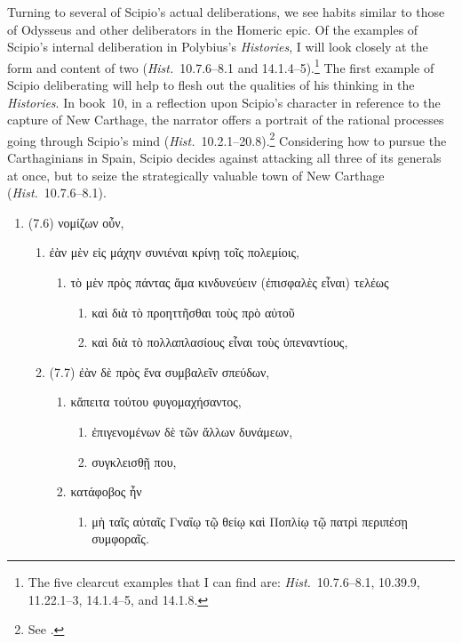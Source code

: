 \documentclass[12pt,letterpaper,oneside,final]{memoir}
\begin{document}
Turning to several of Scipio's actual deliberations, we see habits similar to those of Odysseus and other deliberators in the Homeric epic. Of the examples of Scipio's internal deliberation in Polybius's \emph{Histories}, I will look closely at the form and content of two (\emph{Hist.}~10.7.6--8.1 and 14.1.4--5).\footnote{The five clearcut examples that I can find are: \emph{Hist.}~10.7.6--8.1, 10.39.9, 11.22.1--3, 14.1.4--5, and 14.1.8.} The first example of Scipio deliberating will help to flesh out the qualities of his thinking in the \emph{Histories}. In book~10, in a reflection upon Scipio's character in reference to the capture of New Carthage, the narrator offers a portrait of the rational processes going through Scipio's mind (\emph{Hist.}~10.2.1--20.8).\footnote{See \textcite[192--196]{walbank1967}.} Considering how to pursue the Carthaginians in Spain, Scipio decides against attacking all three of its generals at once, but to seize the strategically valuable town of New Carthage (\emph{Hist.}~10.7.6--8.1). \begin{greek} \begin{enumerate} \SingleSpacing 
\item (7.6) νομίζων οὖν, 
  \begin{enumerate} 
  \item ἐὰν μὲν εἰς μάχην συνιέναι κρίνῃ τοῖς πολεμίοις, 
    \begin{enumerate} 
    \item τὸ μὲν πρὸς πάντας ἅμα κινδυνεύειν (ἐπισφαλὲς εἶναι) τελέως 
      \begin{enumerate}
      \item καὶ διὰ τὸ προηττῆσθαι τοὺς πρὸ αὐτοῦ 
      \item καὶ διὰ τὸ πολλαπλασίους εἶναι τοὺς ὑπεναντίους,
      \end{enumerate}
    \end{enumerate}
  \item (7.7) ἐὰν δὲ πρὸς ἕνα συμβαλεῖν σπεύδων, 
    \begin{enumerate}
    \item κἄπειτα τούτου φυγομαχήσαντος, 
      \begin{enumerate}
      \item ἐπιγενομένων δὲ τῶν ἄλλων δυνάμεων,
      \item συγκλεισθῇ που,
      \end{enumerate}
    \item κατάφοβος ἦν
      \begin{enumerate}
      \item μὴ ταῖς αὐταῖς Γναΐῳ τῷ θείῳ καὶ Ποπλίῳ τῷ πατρὶ περιπέσῃ συμφοραῖς.

\end{enumerate}
\end{enumerate}
\end{enumerate}
\end{enumerate}
\end{greek}
\end{document}
